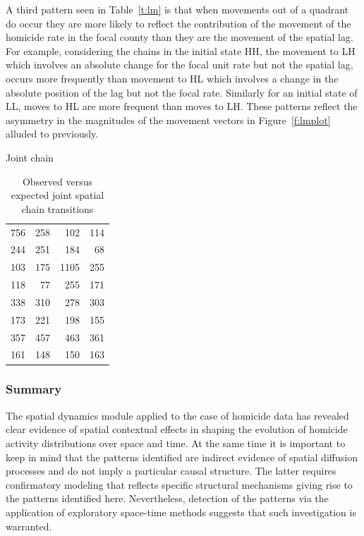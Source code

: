 \documentclass[11pt, titlepage]{article}
\begin{document}
A third pattern seen in Table~\ref{t:lm} is that when movements out of a
quadrant do occur they are more likely to reflect the contribution of
the movement of the homicide rate in the focal county than they are the
movement of the spatial lag. For example, considering the chains in the
initial state HH, the movement to LH which involves an absolute change
for the focal unit rate but not the spatial lag, occurs more frequently
than movement to HL which involves a change in the absolute position of
the lag but not the focal rate. Similarly for an initial state of LL,
moves to HL are more frequent than moves to LH. These patterns reflect
the asymmetry in the magnitudes of the movement vectors in
Figure~\ref{f:lmplot} alluded to previously.


Joint chain


\begin{table}
  \centering
  \small
\begin{tabular}{|rrrr|}\hline
756 &258 &102 &114\\
244 &251 &184 &68\\
103 &175 &1105 &255\\
118 &77  &255 &171\\
\hline
338 &310 &278 &303\\
173 &221 &198 &155\\
357 &457 &463 &361\\
161 &148 &150 &163\\
\hline
\end{tabular}
\caption{Observed versus expected joint spatial chain transitions}
\label{t:jc}
\end{table}



\subsubsection{Summary}
The spatial dynamics module applied to the case of homicide data has
revealed clear evidence of spatial contextual effects in shaping the
evolution of homicide activity distributions over space and time. At the
same time it is important to keep in mind that the patterns identified
are indirect evidence of spatial diffusion processes and do not imply a
particular causal structure. The latter requires confirmatory modeling
that reflects specific structural mechanisms giving rise to the patterns
identified here. Nevertheless, detection of the patterns via the
application of exploratory space-time methods suggests that such investigation is
warranted.
\end{document}
